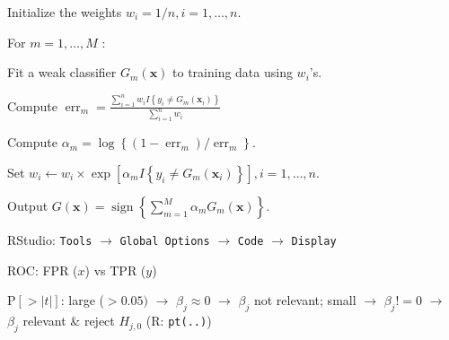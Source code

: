 \begin{sectionbox}[AdaBoost.M1]\nospacing{}

  \begin{enumeratenosep}[label=\roman*]
\item Initialize the weights $w_{i}=1 / n, i=1, \ldots, n$.
\item For $m=1, \ldots, M$ :
\begin{enumeratenosep}[label=\alph*)]
    \item Fit a weak classifier $G_{m}(\boldsymbol{x})$ to training data using $w_{i}$'s.
\item Compute
$
\operatorname{err}_{m}=\frac{\sum_{i=1}^{n} w_{i} I\left\{y_{i} \neq G_{m}\left(\boldsymbol{x}_{i}\right)\right\}}{\sum_{i=1}^{n} w_{i}}
$
\item Compute $\alpha_{m}=\log \left\{\left(1-\operatorname{err}_{m}\right) / \operatorname{err}_{m}\right\}$.
\item Set $w_{i} \leftarrow w_{i} \times \exp \left[\alpha_{m} I\left\{y_{i} \neq G_{m}\left(\boldsymbol{x}_{i}\right)\right\}\right], i=1, \ldots, n$.
\end{enumeratenosep}

\item Output $G(\boldsymbol{x})=\operatorname{sign}\left\{\sum_{m=1}^{M} \alpha_{m} G_{m}(\boldsymbol{x})\right\}$.
\end{enumeratenosep}
\end{sectionbox}
\begin{notebox}[Misc]\nospacing{}
  \begin{enumeratenosep}[label=\roman*]
    \item RStudio: \texttt{Tools} $\rightarrow$ \texttt{Global Options} $\rightarrow$ \texttt{Code} $\rightarrow$ \texttt{Display}
    \item ROC: FPR ($x$) vs TPR ($y$)
    \item $\text{P}[>|t|]$: large ($>0.05)$ $\rightarrow$ $\beta_j \approx 0$ $\rightarrow$ $\beta_j$ not relevant; small $\rightarrow$ $\beta_j!=0$ $\rightarrow$ $\beta_j$ relevant \& reject $H_{j,0}$ (R: \texttt{pt(..)})
  \end{enumeratenosep}
\end{notebox}

